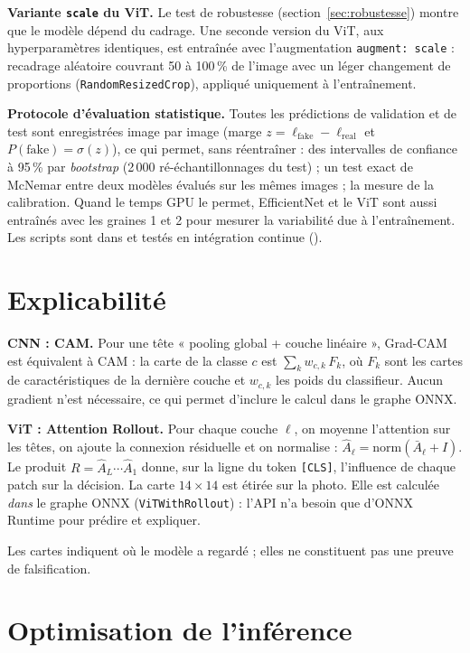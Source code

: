 \documentclass[11pt,a4paper]{article}
\DeclareRobustCommand{\fichier}[1]{\texttt{\StrSubstitute{\detokenize{#1}}{/}{/\allowbreak}}}
\begin{document}
\textbf{Variante \texttt{scale} du ViT.} Le test de robustesse (section~\ref{sec:robustesse}) montre que le modèle dépend
du cadrage. Une seconde version du ViT, aux hyperparamètres identiques, est entraînée avec l'augmentation
\texttt{augment: scale} : recadrage aléatoire couvrant 50 à 100\,\% de l'image avec un léger changement de proportions
(\texttt{RandomResizedCrop}), appliqué uniquement à l'entraînement.

\textbf{Protocole d'évaluation statistique.} Toutes les prédictions de validation et de test sont enregistrées image par
image (marge $z=\ell_{\text{fake}}-\ell_{\text{real}}$ et $P(\text{fake})=\sigma(z)$), ce qui permet, sans réentraîner :
des intervalles de confiance à 95\,\% par \emph{bootstrap} (2\,000 ré-échantillonnages du test) ; un test exact de
McNemar entre deux modèles évalués sur les mêmes images ; la mesure de la calibration. Quand le temps GPU le permet,
EfficientNet et le ViT sont aussi entraînés avec les graines 1 et 2 pour mesurer la variabilité due à l'entraînement.
Les scripts sont dans \fichier{src/analysis/} et testés en intégration continue (\fichier{tests/test_analysis.py}).

\section{Explicabilité}

\textbf{CNN : CAM.} Pour une tête « pooling global + couche linéaire », Grad-CAM est équivalent à CAM : la carte de la
classe $c$ est $\sum_k w_{c,k}\,F_k$, où $F_k$ sont les cartes de caractéristiques de la dernière couche et $w_{c,k}$ les
poids du classifieur. Aucun gradient n'est nécessaire, ce qui permet d'inclure le calcul dans le graphe ONNX.

\textbf{ViT : Attention Rollout.} Pour chaque couche $\ell$, on moyenne l'attention sur les têtes, on ajoute la
connexion résiduelle et on normalise : $\hat A_\ell=\mathrm{norm}(\bar A_\ell+I)$. Le produit
$R=\hat A_L\cdots\hat A_1$ donne, sur la ligne du token \texttt{[CLS]}, l'influence de chaque patch sur la décision.
La carte $14\times14$ est étirée sur la photo. Elle est calculée \emph{dans} le graphe ONNX
(\texttt{ViTWithRollout}) : l'API n'a besoin que d'ONNX Runtime pour prédire et expliquer.

Les cartes indiquent où le modèle a regardé ; elles ne constituent pas une preuve de falsification.

\section{Optimisation de l'inférence}
\end{document}
